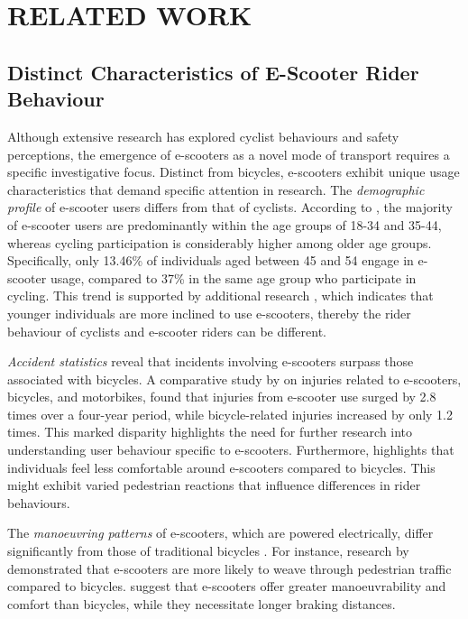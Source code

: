 \section{RELATED WORK}
\subsection{Distinct Characteristics of E-Scooter Rider Behaviour}

Although extensive research has explored cyclist behaviours and safety perceptions, the emergence of e-scooters as a novel mode of transport requires a specific investigative focus. Distinct from bicycles, e-scooters exhibit unique usage characteristics that demand specific attention in research. The \textit{demographic profile} of e-scooter users differs from that of cyclists. According to \cite{WeRideAustraliaReport}, the majority of e-scooter users are predominantly within the age groups of 18-34 and 35-44, whereas cycling participation is considerably higher among older age groups. Specifically, only 13.46\% of individuals aged between 45 and 54 engage in e-scooter usage, compared to 37\% in the same age group who participate in cycling. This trend is supported by additional research \cite{su142114303, NIKIFORIADIS2021102790}, which indicates that younger individuals are more inclined to use e-scooters, thereby the rider behaviour of cyclists and e-scooter riders can be different.

\textit{Accident statistics} reveal that incidents involving e-scooters surpass those associated with bicycles. A comparative study by \citet{james2023comparison} on injuries related to e-scooters, bicycles, and motorbikes, found that injuries from e-scooter use surged by 2.8 times over a four-year period, while bicycle-related injuries increased by only 1.2 times. This marked disparity highlights the need for further research into understanding user behaviour specific to e-scooters. Furthermore, \citet{su11205591} highlights that individuals feel less comfortable around e-scooters compared to bicycles. This might exhibit varied pedestrian reactions that influence differences in rider behaviours.

The \textit{manoeuvring patterns} of e-scooters, which are powered electrically, differ significantly from those of traditional bicycles \cite {10.1145/3313831.3376499}. For instance, research by \citet{visualAttenstionTobii} demonstrated that e-scooters are more likely to weave through pedestrian traffic compared to bicycles. \citet{dozza2022data} suggest that e-scooters offer greater manoeuvrability and comfort than bicycles, while they necessitate longer braking distances.

